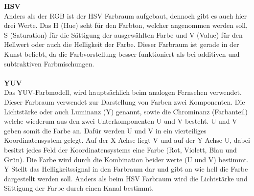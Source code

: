\textbf{HSV}\label{s.hsv}\\
Anders als der RGB ist der HSV Farbraum aufgebaut, dennoch gibt es auch hier drei Werte. Das H (Hue) seht für den Farbton, welcher angenommen werden soll, S (Saturation) für die Sättigung der ausgewählten Farbe und V (Value) für den Hellwert oder auch die Helligkeit der Farbe. Dieser Farbraum ist gerade in der Kunst beliebt, da die Farbvorstellung besser funktioniert als bei additiven und subtraktiven Farbmischungen.\\\\
\textbf{YUV}\label{s.lab}\\
Das YUV-Farbmodell, wird hauptsächlich beim analogen Fernsehen verwendet. Dieser Farbraum verwendet zur Darstellung von Farben zwei Komponenten. Die Lichtstärke oder auch Luminanz (Y) genannt, sowie die Chrominanz (Farbanteil) welche wiederum aus den zwei Unterkomponenten U und V besteht. U und V geben somit die Farbe an. Dafür werden U und V in ein vierteiliges Koordinatensystem gelegt. Auf der X-Achse liegt V und auf der Y-Achse U, dabei besitzt jedes Feld der Koordinatensystems eine Farbe (Rot, Violett, Blau und Grün). Die Farbe wird durch die Kombination beider werte (U und V) bestimmt. Y Stellt das Helligkeitssignal in den Farbraum dar und gibt an wie hell die Farbe dargestellt werden soll. Anders als beim HSV Farbraum wird die Lichtstärke und Sättigung der Farbe durch einen Kanal bestimmt. 
